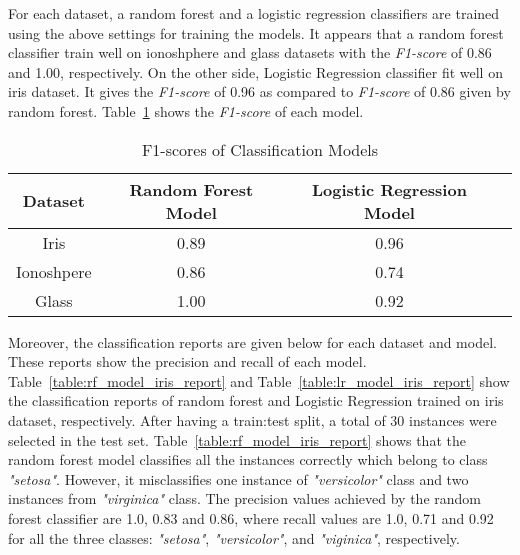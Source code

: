 \documentclass[english]{tktltiki2}
\theoremstyle{definition}
\theoremstyle{remark}
\begin{document}
For each dataset, a random forest and a logistic regression classifiers are trained using the above settings for training the models. It appears that a random forest classifier train well on ionoshphere and glass datasets with the \textit{F1-score} of 0.86 and 1.00, respectively. On the other side, Logistic Regression classifier fit well on iris dataset. It gives the \textit{F1-score} of 0.96 as compared to \textit{F1-score} of 0.86 given by random forest. Table~\ref{table:training_models_F1_score_datasets_UCI} shows the \textit{F1-score} of each model.

\begin{table}[H]
	\caption{F1-scores of Classification Models}
	\label{table:training_models_F1_score_datasets_UCI}
	\begin{center}
		\begin{tabular}{@{}cccc@{}}
			\toprule
			Dataset & Random Forest Model & Logistic Regression Model \\ \hline
			
			\multicolumn{1}{|c|}{Iris} & \multicolumn{1}{c|}{0.89} & \multicolumn{1}{c|}{0.96} \\ \hline
			
			\multicolumn{1}{|c|}{Ionoshpere} & \multicolumn{1}{c|}{0.86} & \multicolumn{1}{c|}{0.74} \\ \hline
			
			\multicolumn{1}{|c|}{Glass} & \multicolumn{1}{c|}{1.00} & \multicolumn{1}{c|}{0.92} \\ \hline
			
		\end{tabular}
	\end{center}
\end{table}



Moreover, the classification reports are given below for each dataset and model. These reports show the precision and recall of each model.
Table~\ref{table:rf_model_iris_report} and Table~\ref{table:lr_model_iris_report} show the classification reports of random forest and Logistic Regression trained on iris dataset, respectively. After having a train:test split, a total of 30 instances were selected in the test set. Table~\ref{table:rf_model_iris_report} shows that the random forest model classifies all the instances correctly which belong to class \textit{"setosa"}. However, it misclassifies one instance of \textit{"versicolor"} class and two instances from \textit{"virginica"} class. The precision values achieved by the random forest classifier are 1.0, 0.83 and 0.86, where recall values are 1.0, 0.71 and 0.92 for all the three classes: \textit{"setosa"}, \textit{"versicolor"}, and \textit{"viginica"}, respectively.  
\end{document}
